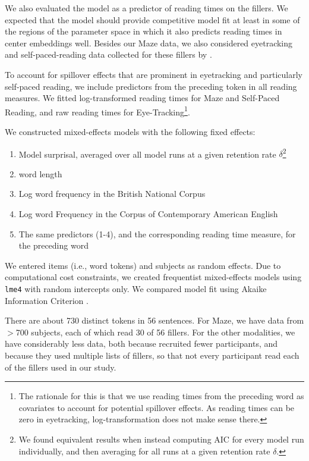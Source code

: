 We also evaluated the model as a predictor of reading times on the fillers.
We expected that the model should provide competitive model fit at least in some of the regions of the parameter space in which it also predicts reading times in center embeddings well.
Besides our Maze data, we also considered eyetracking and self-paced-reading data collected for these fillers by \cite{vasishth2010short}.

To account for spillover effects that are prominent in eyetracking and particularly self-paced reading, we include predictors from the preceding token in all reading measures.
We fitted log-transformed reading times for Maze and Self-Paced Reading, and raw reading times for Eye-Tracking\footnote{The rationale for this is that we use reading times from the preceding word as covariates to account for potential spillover effects. As reading times can be zero in eyetracking, log-transformation does not make sense there.}.

We constructed mixed-effects models with the following fixed effects:
\begin{enumerate}
	\item Model surprisal, averaged over all model runs at a given retention rate $\delta$\footnote{We found equivalent results when instead computing AIC for every model run individually, and then averaging for all runs at a given retention rate $\delta$.}
\item word length
\item Log word frequency in the British National Corpus \citep{Leech1992100MW}
\item Log word Frequency in the Corpus of Contemporary American English \citep[COCA][]{Davies2012TheCO}
\item The same predictors (1-4), and the corresponding reading time measure, for the preceding word
\end{enumerate}
We entered items (i.e., word tokens) and subjects as random effects.
Due to computational cost constraints, we created frequentist mixed-effects models using \texttt{lme4} \citep{Bates2014FittingLM} with random intercepts only.
We compared model fit using Akaike Information Criterion \citep[AIC][]{Akaike1973InformationTA}.

There are about 730 distinct tokens in 56 sentences.
For Maze, we have data from $>$700 subjects, each of which read 30 of 56 fillers. 
For the other modalities, we have considerably less data, both because \cite{vasishth2010short} recruited fewer participants, and because they used multiple lists of fillers, so that not every participant read each of the fillers used in our study.

